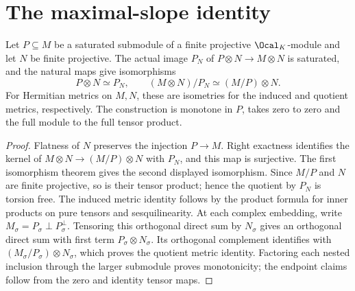 \chapter{The maximal-slope identity}

\begin{lemma}
\label{lem:tensor-saturated-submodule}
\leanok
Let $P\subseteq M$ be a saturated submodule of a finite projective
$\Ocal_K$-module and let $N$ be finite projective. The actual image
$P_N$ of $P\otimes N\to M\otimes N$ is saturated, and the natural maps
give isomorphisms
\[
 P\otimes N\simeq P_N,\qquad
 (M\otimes N)/P_N\simeq (M/P)\otimes N.
\]
For Hermitian metrics on $M,N$, these are isometries for the induced
and quotient metrics, respectively. The construction is monotone in
$P$, takes zero to zero and the full module to the full tensor product.
\end{lemma}
\begin{proof}
Flatness of $N$ preserves the injection $P\to M$. Right exactness
identifies the kernel of $M\otimes N\to(M/P)\otimes N$ with $P_N$,
and this map is surjective. The first isomorphism theorem gives the
second displayed isomorphism. Since $M/P$ and $N$ are finite projective,
so is their tensor product; hence the quotient by $P_N$ is torsion free.
The induced metric identity follows by the product formula for inner
products on pure tensors and sesquilinearity. At each complex embedding,
write $M_\sigma=P_\sigma\mathbin{\perp}P_\sigma^\perp$.
Tensoring this orthogonal direct sum by $N_\sigma$ gives an orthogonal
direct sum with first term $P_\sigma\otimes N_\sigma$. Its orthogonal
complement identifies with $(M_\sigma/P_\sigma)\otimes N_\sigma$,
which proves the quotient metric identity. Factoring each nested
inclusion through the larger submodule proves monotonicity; the endpoint
claims follow from the zero and identity tensor maps.
\end{proof}

